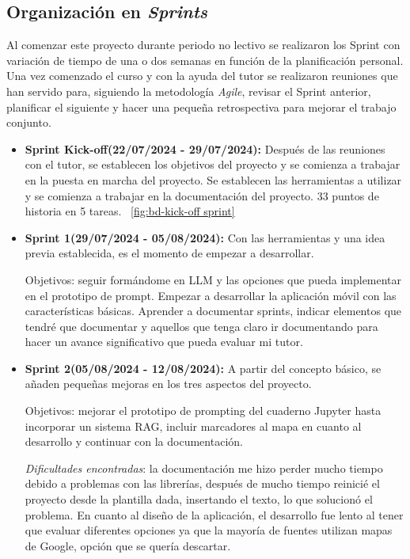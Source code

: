 \subsection{Organización en \textit{Sprints}}

Al comenzar este proyecto durante periodo no lectivo se realizaron los Sprint con variación de tiempo de una o dos semanas en función de la planificación personal. Una vez comenzado el curso y con la ayuda del tutor se realizaron reuniones que han servido para, siguiendo la metodología \textit{Agile}, revisar el Sprint anterior, planificar el siguiente y hacer una pequeña retrospectiva para mejorar el trabajo conjunto.


\begin{itemize}
    \item \textbf{Sprint Kick-off(22/07/2024 - 29/07/2024):} Después de las reuniones con el tutor, se establecen los objetivos del proyecto y se comienza a trabajar en la puesta en marcha del proyecto. Se establecen las herramientas a utilizar y se comienza a trabajar en la documentación del proyecto. 33 puntos de historia en 5 tareas.
    ~\ref{fig:bd-kick-off sprint}
    

    \item \textbf{Sprint 1(29/07/2024 - 05/08/2024):} Con las herramientas y una idea previa establecida, es el momento de empezar a desarrollar.

    Objetivos: seguir formándome en LLM y las opciones que pueda implementar en el prototipo de prompt.
    Empezar a desarrollar la aplicación móvil con las características básicas.
    Aprender a documentar sprints, indicar elementos que tendré que documentar y aquellos que tenga claro ir documentando para hacer un avance significativo que pueda evaluar mi tutor.
    
    \item \textbf{Sprint 2(05/08/2024 - 12/08/2024):} A partir del concepto básico, se añaden pequeñas mejoras en los tres aspectos del proyecto.
    
    Objetivos: mejorar el prototipo de prompting del cuaderno Jupyter hasta incorporar un sistema RAG, incluir marcadores al mapa en cuanto al desarrollo y continuar con la documentación.
    
    \textit{Dificultades encontradas}: la documentación me hizo perder mucho tiempo debido a problemas con las librerías, después de mucho tiempo reinicié el proyecto desde la plantilla dada, insertando el texto, lo que solucionó el problema. En cuanto al diseño de la aplicación, el desarrollo fue lento al tener que evaluar diferentes opciones ya que la mayoría de fuentes utilizan mapas de Google, opción que se quería descartar.


\end{itemize}
